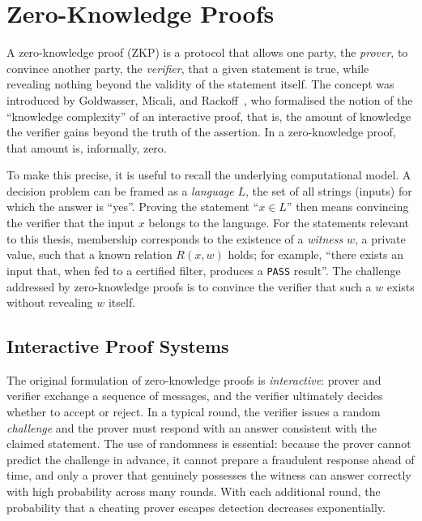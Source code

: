\section{Zero-Knowledge Proofs}
\label{sec:bg-zkp}

A zero-knowledge proof (ZKP) is a protocol that allows one party, the \emph{prover}, to convince another party, the \emph{verifier}, that a given statement is true, while revealing nothing beyond the validity of the statement itself. The concept was introduced by Goldwasser, Micali, and Rackoff~\cite{goldwasser1989knowledge}, who formalised the notion of the ``knowledge complexity'' of an interactive proof, that is, the amount of knowledge the verifier gains beyond the truth of the assertion. In a zero-knowledge proof, that amount is, informally, zero.

\medskip

To make this precise, it is useful to recall the underlying computational model. A decision problem can be framed as a \emph{language} $L$, the set of all strings (inputs) for which the answer is ``yes''. Proving the statement ``$x \in L$'' then means convincing the verifier that the input $x$ belongs to the language. For the statements relevant to this thesis, membership corresponds to the existence of a \emph{witness} $w$, a private value, such that a known relation $R(x, w)$ holds; for example, ``there exists an input that, when fed to a certified filter, produces a \texttt{PASS} result''. The challenge addressed by zero-knowledge proofs is to convince the verifier that such a $w$ exists without revealing $w$ itself.

\subsection{Interactive Proof Systems}
\label{subsec:bg-interactive}

The original formulation of zero-knowledge proofs is \emph{interactive}: prover and verifier exchange a sequence of messages, and the verifier ultimately decides whether to accept or reject. In a typical round, the verifier issues a random \emph{challenge} and the prover must respond with an answer consistent with the claimed statement. The use of randomness is essential: because the prover cannot predict the challenge in advance, it cannot prepare a fraudulent response ahead of time, and only a prover that genuinely possesses the witness can answer correctly with high probability across many rounds. With each additional round, the probability that a cheating prover escapes detection decreases exponentially.

